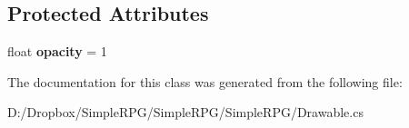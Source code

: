 \subsection*{Protected Attributes}
\begin{DoxyCompactItemize}
\item 
\hypertarget{class_simple_r_p_g_1_1_drawable_a7378ddf59da70427cd4315925a9273b3}{float {\bfseries opacity} = 1}\label{class_simple_r_p_g_1_1_drawable_a7378ddf59da70427cd4315925a9273b3}

\end{DoxyCompactItemize}


The documentation for this class was generated from the following file\+:\begin{DoxyCompactItemize}
\item 
D\+:/\+Dropbox/\+Simple\+R\+P\+G/\+Simple\+R\+P\+G/\+Simple\+R\+P\+G/Drawable.\+cs\end{DoxyCompactItemize}
